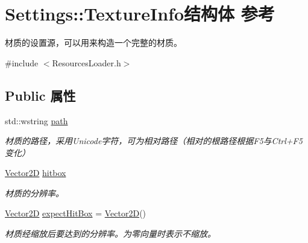 \hypertarget{struct_settings_1_1_texture_info}{}\section{Settings\+:\+:Texture\+Info结构体 参考}
\label{struct_settings_1_1_texture_info}


材质的设置源，可以用来构造一个完整的材质。  




{\ttfamily \#include $<$Resources\+Loader.\+h$>$}

\subsection*{Public 属性}
\begin{DoxyCompactItemize}
\item 
\mbox{\label{struct_settings_1_1_texture_info_ae8163d14505552c69b973a262fb896f6}} 
std\+::wstring \hyperlink{struct_settings_1_1_texture_info_ae8163d14505552c69b973a262fb896f6}{path}
\begin{DoxyCompactList}\small\item\em 材质的路径，采用\+Unicode字符，可为相对路径（相对的根路径根据\+F5与\+Ctrl+\+F5变化） \end{DoxyCompactList}\item 
\mbox{\label{struct_settings_1_1_texture_info_a5b7e1f0b9d305faa03de6d0c31cc0859}} 
\hyperlink{structbasic__vector2_d}{Vector2D} \hyperlink{struct_settings_1_1_texture_info_a5b7e1f0b9d305faa03de6d0c31cc0859}{hitbox}
\begin{DoxyCompactList}\small\item\em 材质的分辨率。 \end{DoxyCompactList}\item 
\mbox{\label{struct_settings_1_1_texture_info_a4bec21902818b3afb2993e5d67a62dfe}} 
\hyperlink{structbasic__vector2_d}{Vector2D} \hyperlink{struct_settings_1_1_texture_info_a4bec21902818b3afb2993e5d67a62dfe}{expect\+Hit\+Box} = \hyperlink{structbasic__vector2_d}{Vector2D}()
\begin{DoxyCompactList}\small\item\em 材质经缩放后要达到的分辨率。为零向量时表示不缩放。 \end{DoxyCompactList}\end{DoxyCompactItemize}


